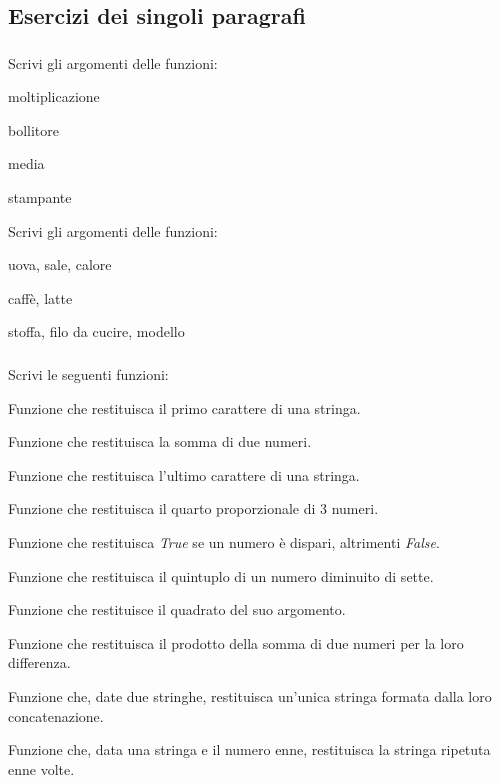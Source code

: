 \subsection{Esercizi dei singoli paragrafi}
\subsubsection*{}

\begin{esercizio}\label{ese:}
Scrivi gli argomenti delle funzioni:
 \begin{enumeratea}
  \item  moltiplicazione
  \item  bollitore
  \item  media
  \item  stampante
 \end{enumeratea}
\end{esercizio}

\begin{esercizio}\label{ese:}
Scrivi gli argomenti delle funzioni:
 \begin{enumeratea}
  \item  uova, sale, calore
  \item  caffè, latte
  \item  stoffa, filo da cucire, modello
 \end{enumeratea}
\end{esercizio}



\subsubsection*{}

\begin{esercizio}\label{ese:}
Scrivi le seguenti funzioni:
 \begin{enumeratea}
\item Funzione che restituisca il primo carattere di una stringa.
\item Funzione che restituisca la somma di due numeri. 
\item Funzione che restituisca l'ultimo carattere di una stringa. 
\item Funzione che restituisca il quarto proporzionale di 3 numeri. 
\item Funzione che restituisca \emph{True} se un numero è dispari, 
altrimenti \emph{False}.
\item Funzione che restituisca il quintuplo di un numero diminuito di sette.
\item Funzione che restituisce il quadrato del suo argomento.
\item Funzione che restituisca il prodotto della somma di due numeri per la 
loro differenza.
\item Funzione che, date due stringhe, restituisca un'unica stringa formata 
dalla loro concatenazione.
\item Funzione che, data una stringa e il numero enne, restituisca la 
stringa ripetuta enne volte.
 \end{enumeratea}
\end{esercizio}

